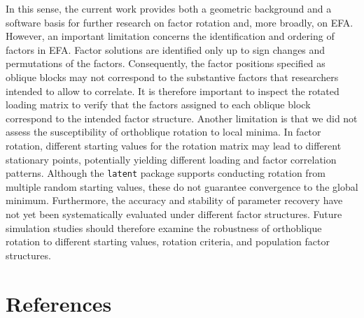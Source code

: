 \documentclass[
  12pt,
  letterpaper,
  article]{scrartcl}
\begin{document}
In this sense, the current work provides both a geometric background and
a software basis for further research on factor rotation and, more
broadly, on EFA. However, an important limitation concerns the
identification and ordering of factors in EFA. Factor solutions are
identified only up to sign changes and permutations of the factors.
Consequently, the factor positions specified as oblique blocks may not
correspond to the substantive factors that researchers intended to allow
to correlate. It is therefore important to inspect the rotated loading
matrix to verify that the factors assigned to each oblique block
correspond to the intended factor structure. Another limitation is that
we did not assess the susceptibility of orthoblique rotation to local
minima. In factor rotation, different starting values for the rotation
matrix may lead to different stationary points, potentially yielding
different loading and factor correlation patterns. Although the
\texttt{latent} package supports conducting rotation from multiple
random starting values, these do not guarantee convergence to the global
minimum. Furthermore, the accuracy and stability of parameter recovery
have not yet been systematically evaluated under different factor
structures. Future simulation studies should therefore examine the
robustness of orthoblique rotation to different starting values,
rotation criteria, and population factor structures.

\newpage

\section*{References}\label{references}
\end{document}
